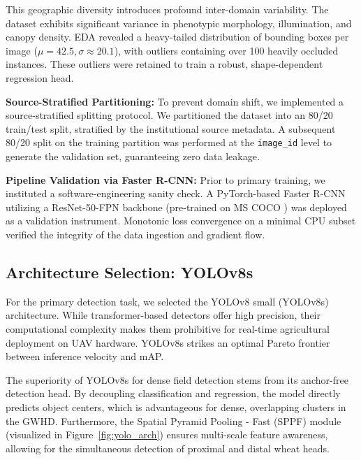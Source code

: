 This geographic diversity introduces profound inter-domain variability. The dataset exhibits significant variance in phenotypic morphology, illumination, and canopy density. EDA revealed a heavy-tailed distribution of bounding boxes per image ($\mu=42.5, \sigma \approx 20.1$), with outliers containing over 100 heavily occluded instances. These outliers were retained to train a robust, shape-dependent regression head.

\textbf{Source-Stratified Partitioning:} To prevent domain shift, we implemented a source-stratified splitting protocol. We partitioned the dataset into an 80/20 train/test split, stratified by the institutional source metadata. A subsequent 80/20 split on the training partition was performed at the \texttt{image\_id} level to generate the validation set, guaranteeing zero data leakage.

\textbf{Pipeline Validation via Faster R-CNN:} Prior to primary training, we instituted a software-engineering sanity check. A PyTorch-based Faster R-CNN \cite{ren2015faster} utilizing a ResNet-50-FPN backbone (pre-trained on MS COCO \cite{lin2014microsoft}) was deployed as a validation instrument. Monotonic loss convergence on a minimal CPU subset verified the integrity of the data ingestion and gradient flow.

\subsection{Architecture Selection: YOLOv8s}
\label{subsec:architecture}

For the primary detection task, we selected the YOLOv8 small (YOLOv8s) architecture. While transformer-based detectors offer high precision, their computational complexity makes them prohibitive for real-time agricultural deployment on UAV hardware. YOLOv8s strikes an optimal Pareto frontier between inference velocity and mAP.

The superiority of YOLOv8s for dense field detection stems from its anchor-free detection head. By decoupling classification and regression, the model directly predicts object centers, which is advantageous for dense, overlapping clusters in the GWHD. Furthermore, the Spatial Pyramid Pooling - Fast (SPPF) module (visualized in Figure~\ref{fig:yolo_arch}) ensures multi-scale feature awareness, allowing for the simultaneous detection of proximal and distal wheat heads.

